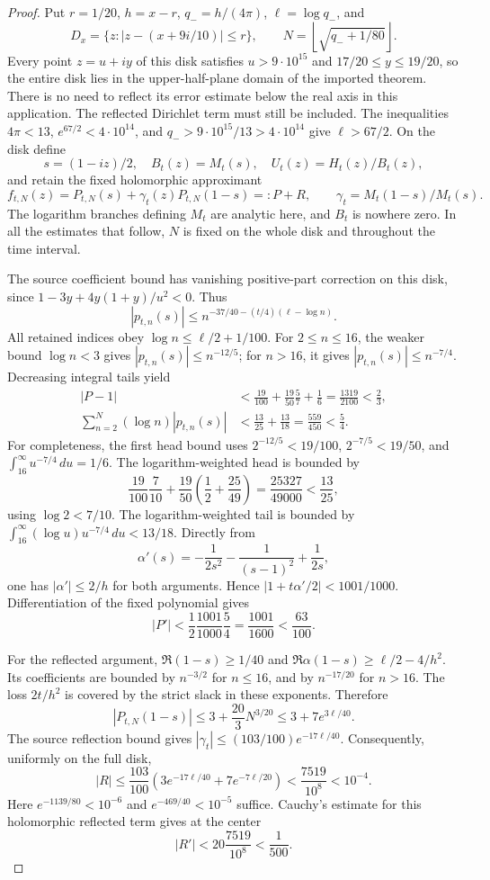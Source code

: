 \documentclass[11pt]{article}
\numberwithin{equation}{section}
\theoremstyle{definition}
\theoremstyle{remark}
\begin{document}
\begin{proof}
Put \(r=1/20\), \(h=x-r\), \(q_-=h/(4\pi)\),
\(\ell=\log q_-\), and
\[
 D_x=\{z:|z-(x+9i/10)|\le r\},\qquad
 N=\left\lfloor\sqrt{q_-+1/80}\right\rfloor.
\]
Every point \(z=u+iy\) of this disk satisfies
\(u>9\cdot10^{15}\) and \(17/20\le y\le19/20\), so the entire disk
lies in the upper-half-plane domain of the imported theorem.  There is no
need to reflect its error estimate below the real axis in this application.
The reflected Dirichlet term must still be included.  The inequalities
\(4\pi<13\), \(e^{67/2}<4\cdot10^{14}\), and
\(q_->9\cdot10^{15}/13>4\cdot10^{14}\) give
\(\ell>67/2\).  On the disk define
\[
 s=(1-iz)/2,\quad B_t(z)=M_t(s),\quad U_t(z)=H_t(z)/B_t(z),
\]
and retain the fixed holomorphic approximant
\[
 f_{t,N}(z)=P_{t,N}(s)+\gamma_t(z)P_{t,N}(1-s)=:P+R,
 \qquad \gamma_t=M_t(1-s)/M_t(s).
\]
The logarithm branches defining \(M_t\) are analytic here, and \(B_t\)
is nowhere zero.  In all the estimates that follow, \(N\) is fixed on
the whole disk and throughout the time interval.

The source coefficient bound has vanishing positive-part correction on
this disk, since \(1-3y+4y(1+y)/u^2<0\).  Thus
\[
 |p_{t,n}(s)|\le
 n^{-37/40-(t/4)(\ell-\log n)}.
\]
All retained indices obey \(\log n\le\ell/2+1/100\).
For \(2\le n\le16\), the weaker bound \(\log n<3\) gives
\(|p_{t,n}(s)|\le n^{-12/5}\); for \(n>16\), it gives
\(|p_{t,n}(s)|\le n^{-7/4}\).  Decreasing integral tails yield
\begin{align*}
 |P-1|&<\frac{19}{100}+\frac{19}{50}\frac57+\frac16
       =\frac{1319}{2100}<\frac23,\\
 \sum_{n=2}^{N}(\log n)|p_{t,n}(s)|
 &<\frac{13}{25}+\frac{13}{18}=\frac{559}{450}<\frac54.
\end{align*}
For completeness, the first head bound uses
\(2^{-12/5}<19/100\), \(2^{-7/5}<19/50\), and
\(\int_{16}^{\infty}u^{-7/4}\,du=1/6\).
The logarithm-weighted head is bounded by
\[
 \frac{19}{100}\frac7{10}
 +\frac{19}{50}\left(\frac12+\frac{25}{49}\right)
 =\frac{25327}{49000}<\frac{13}{25},
\]
using \(\log2<7/10\).  The logarithm-weighted tail is bounded by
\(\int_{16}^{\infty}(\log u)u^{-7/4}\,du<13/18\).
Directly from
\[
 \alpha'(s)=-\frac1{2s^2}-\frac1{(s-1)^2}+\frac1{2s},
\]
one has \(|\alpha'|\le2/h\) for both arguments.  Hence
\(|1+t\alpha'/2|<1001/1000\).  Differentiation of the fixed polynomial
gives
\[
 |P'|<\frac12\frac{1001}{1000}\frac54
       =\frac{1001}{1600}<\frac{63}{100}.
\]

For the reflected argument, \(\Re(1-s)\ge1/40\) and
\(\Re\alpha(1-s)\ge\ell/2-4/h^2\).  Its coefficients are bounded
by \(n^{-3/2}\) for \(n\le16\), and by \(n^{-17/20}\) for
\(n>16\).  The loss \(2t/h^2\) is covered by the strict slack in
these exponents.  Therefore
\[
 |P_{t,N}(1-s)|\le3+\frac{20}{3}N^{3/20}
                 \le3+7e^{3\ell/40}.
\]
The source reflection bound gives
\(|\gamma_t|\le(103/100)e^{-17\ell/40}\).  Consequently, uniformly
on the full disk,
\[
 |R|\le\frac{103}{100}
       \left(3e^{-17\ell/40}+7e^{-7\ell/20}\right)
       <\frac{7519}{10^8}<10^{-4}.
\]
Here \(e^{-1139/80}<10^{-6}\) and \(e^{-469/40}<10^{-5}\) suffice.
Cauchy's estimate for this holomorphic reflected term gives at the center
\[
 |R'|<20\frac{7519}{10^8}<\frac1{500}.
\]


\end{proof}
\end{document}
